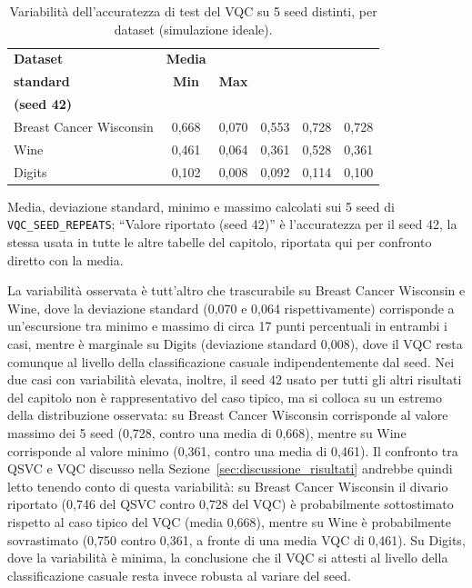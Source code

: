 \begin{table}[htbp]
\centering
\caption{Variabilità dell'accuratezza di test del VQC su 5 seed distinti, per dataset (simulazione ideale).}
\label{tab:vqc_seed_repeats}
{\renewcommand{\arraystretch}{1.5}
\footnotesize
\begin{tabular}{>{\raggedright\arraybackslash}p{3.6cm}ccccc}
\toprule
\textbf{Dataset} & \textbf{Media} & \thead{\textbf{Dev.}\\\textbf{standard}} & \textbf{Min} & \textbf{Max} & \thead{\textbf{Valore riportato}\\\textbf{(seed 42)}} \\
\midrule
Breast Cancer Wisconsin & 0,668 & 0,070 & 0,553 & 0,728 & 0,728 \\
Wine & 0,461 & 0,064 & 0,361 & 0,528 & 0,361 \\
Digits & 0,102 & 0,008 & 0,092 & 0,114 & 0,100 \\
\bottomrule
\end{tabular}
}

\medskip
{\footnotesize Media, deviazione standard, minimo e massimo calcolati sui 5 seed di \texttt{VQC\_SEED\_REPEATS}; ``Valore riportato (seed 42)'' è l'accuratezza per il seed 42, la stessa usata in tutte le altre tabelle del capitolo, riportata qui per confronto diretto con la media.}
\end{table}

La variabilità osservata è tutt'altro che trascurabile su Breast Cancer Wisconsin e Wine, dove la deviazione standard (0,070 e 0,064 rispettivamente) corrisponde a un'escursione tra minimo e massimo di circa 17 punti percentuali in entrambi i casi, mentre è marginale su Digits (deviazione standard 0,008), dove il VQC resta comunque al livello della classificazione casuale indipendentemente dal seed. Nei due casi con variabilità elevata, inoltre, il seed 42 usato per tutti gli altri risultati del capitolo non è rappresentativo del caso tipico, ma si colloca su un estremo della distribuzione osservata: su Breast Cancer Wisconsin corrisponde al valore massimo dei 5 seed (0,728, contro una media di 0,668), mentre su Wine corrisponde al valore minimo (0,361, contro una media di 0,461). Il confronto tra QSVC e VQC discusso nella Sezione~\ref{sec:discussione_risultati} andrebbe quindi letto tenendo conto di questa variabilità: su Breast Cancer Wisconsin il divario riportato (0,746 del QSVC contro 0,728 del VQC) è probabilmente sottostimato rispetto al caso tipico del VQC (media 0,668), mentre su Wine è probabilmente sovrastimato (0,750 contro 0,361, a fronte di una media VQC di 0,461). Su Digits, dove la variabilità è minima, la conclusione che il VQC si attesti al livello della classificazione casuale resta invece robusta al variare del seed.

